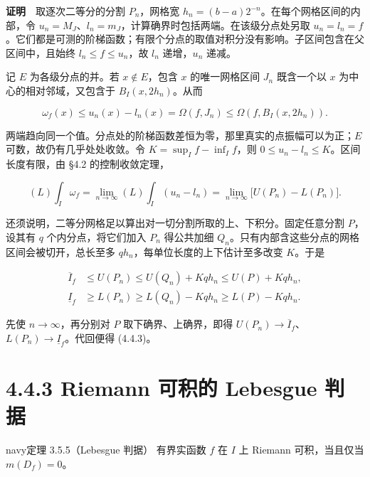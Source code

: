 \documentclass[11pt,a4paper]{article}
\begin{document}
\textbf{证明}　取逐次二等分的分割 \(P_n\)，网格宽
\(h_n=(b-a)2^{-n}\)。在每个网格区间的内部，令
\(u_n=M_J\)、\(l_n=m_J\)，计算确界时包括两端。在该级分点处另取
\(u_n=l_n=f\)。它们都是可测的阶梯函数；有限个分点的取值对积分没有影响。子区间包含在父区间中，且始终
\(l_n\le f\le u_n\)，故 \(l_n\) 递增，\(u_n\) 递减。

记 \(E\) 为各级分点的并。若 \(x\notin E\)，包含 \(x\) 的唯一网格区间
\(J_n\) 既含一个以 \(x\) 为中心的相对邻域，又包含于
\(B_I(x,2h_n)\)。从而

\begin{equation*}
\omega_f(x)\le u_n(x)-l_n(x)=\Omega(f,J_n)
\le\Omega(f,B_I(x,2h_n)).
\end{equation*}

两端趋向同一个值。分点处的阶梯函数差恒为零，那里真实的点振幅可以为正；\(E\)
可数，故仍有几乎处处收敛。令 \(K=\sup_I f-\inf_I f\)，则
\(0\le u_n-l_n\le K\)。区间长度有限，由 §4.2 的控制收敛定理，

\begin{equation*}
(L)\int_I\omega_f=\lim_{n\to\infty}(L)\int_I(u_n-l_n)
=\lim_{n\to\infty}\bigl[U(P_n)-L(P_n)\bigr].
\end{equation*}

还须说明，二等分网格足以算出对一切分割所取的上、下积分。固定任意分割
\(P\)，设其有 \(q\) 个内分点，将它们加入 \(P_n\) 得公共加细
\(Q_n\)。只有内部含这些分点的网格区间会被切开，总长至多
\(qh_n\)，每单位长度的上下估计至多改变 \(K\)。于是

\begin{equation*}
\begin{aligned}
\overline I_f &\le U(P_n)\le U(Q_n)+Kqh_n\le U(P)+Kqh_n,\\
\underline I_f &\ge L(P_n)\ge L(Q_n)-Kqh_n\ge L(P)-Kqh_n .
\end{aligned}
\end{equation*}

先使 \(n\to\infty\)，再分别对 \(P\) 取下确界、上确界，即得
\(U(P_n)\to\overline I_f\)、\(L(P_n)\to\underline I_f\)。代回便得
(4.4.3)。

\section[\S{}4.4.3 Riemann 可积的 Lebesgue
判据]{4.4.3 Riemann 可积的 Lebesgue
判据}\label{riemann-ux53efux79efux7684-lebesgue-ux5224ux636e}

\begin{sboxenv}{navy}{定理 3.5.5（Lebesgue 判据）}
有界实函数 \(f\) 在 \(I\) 上 Riemann 可积，当且仅当 \(m(D_f)=0\)。

\end{sboxenv}
\end{document}

